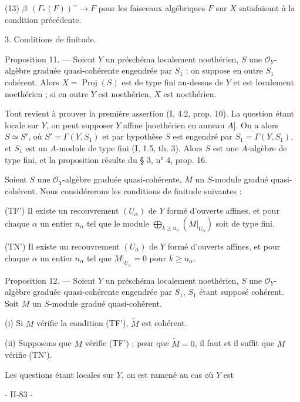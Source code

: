 \newpage


(13) $\beta : (\Gamma_*(F))^{\sim} \to F$
pour les faisceaux algébriques $F$ sur $X$ satisfaisant à la condition précédente.

3. Conditions de finitude.

Proposition 11. — Soient $Y$ un préschéma localement noethérien, $S$ une $\mathcal{O}_Y$-algèbre graduée quasi-cohérente engendrée par $S_1$ ; on suppose en outre $S_1$ cohérent. Alors $X = \operatorname{Proj}(S)$ est de type fini au-dessus de $Y$ et est localement noethérien ; si en outre $Y$ est noethérien, $X$ est noethérien.

Tout revient à prouver la première assertion (I, 4.2, prop. 10). La question étant locale sur $Y$, on peut supposer $Y$ affine [noethérien en anneau $A$]. On a alors $S \simeq S'$, où $S' = \Gamma(Y, S_1)$ et par hypothèse $S$ est engendré par $S_1 = \Gamma(Y, S_1)$, et $S_1$ est un $A$-module de type fini (I, 1.5, th. 3). Alors $S$ est une $A$-algèbre de type fini, et la proposition résulte du § 3, n° 4, prop. 16.

Soient $S$ une $\mathcal{O}_Y$-algèbre graduée quasi-cohérente, $M$ un $S$-module gradué quasi-cohérent. Nous considérerons les conditions de finitude suivantes :

(TF') Il existe un recouvrement $(U_\alpha)$ de $Y$ formé d'ouverts affines, et pour chaque $\alpha$ un entier $n_\alpha$ tel que le module $\bigoplus_{k \ge n_\alpha} (M|_{U_\alpha})$ soit de type fini.

(TN') Il existe un recouvrement $(U_\alpha)$ de $Y$ formé d'ouverts affines, et pour chaque $\alpha$ un entier $n_\alpha$ tel que $M|_{U_\alpha} = 0$ pour $k \ge n_\alpha$.

Proposition 12. — Soient $Y$ un préschéma localement noethérien, $S$ une $\mathcal{O}_Y$-algèbre graduée quasi-cohérente engendrée par $S_1$, $S_1$ étant supposé cohérent. Soit $M$ un $S$-module gradué quasi-cohérent.

(i) Si $M$ vérifie la condition (TF'), $\widetilde{M}$ est cohérent.

(ii) Supposons que $M$ vérifie (TF') ; pour que $\widetilde{M} = 0$, il faut et il suffit que $M$ vérifie (TN').

Les questions étant locales sur $Y$, on est ramené au cas où $Y$ est

\newpage


- II-83 -

